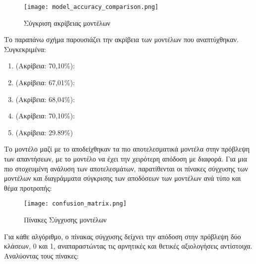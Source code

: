 \begin{figure}[H]
  \begin{center}
    \texttt{[image: model\_accuracy\_comparison.png]}
    \caption{Σύγκριση ακρίβειας μοντέλων}
  \end{center}
  \label{fig:accuracy}
\end{figure}

Το παραπάνω σχήμα παρουσιάζει την ακρίβεια των μοντέλων που
αναπτύχθηκαν. Συγκεκριμένα:

\begin{enumerate}
  \item {} (Ακρίβεια: 70,10\%):
  \item {} (Ακρίβεια: 67,01\%):
  \item {} (Ακρίβεια: 68,04\%):
  \item {} (Ακρίβεια: 70,10\%):
  \item {} (Ακρίβεια: 29.89\%)
\end{enumerate}

Το μοντέλο  μαζί με το 
αποδείχθηκαν τα πιο αποτελεσματικά μοντέλα στην πρόβλεψη των
απαντήσεων, με το μοντέλο  να έχει την χειρότερη απόδοση
με διαφορά. Για μια πιο στοχευμένη ανάλυση των αποτελεσμάτων,
παρατίθενται οι πίνακες σύγχυσης των μοντέλων και διαγράμματα σύγκρισης των αποδόσεων των μοντέλων ανά τύπο και θέμα προτροπής:

\begin{figure}[H]
  \begin{center}
    \texttt{[image: confusion\_matrix.png]}
    \caption{Πίνακες Σύγχυσης μοντέλων}
  \end{center}
  \label{fig:confusionmatrix}
\end{figure}

Για κάθε αλγόριθμο, ο πίνακας σύγχυσης δείχνει την απόδοση στην
πρόβλεψη δύο κλάσεων, 0 και 1, αναπαραστώντας τις αρνητικές και
θετικές αξιολογήσεις αντίστοιχα.
Αναλύοντας τους πίνακες:

